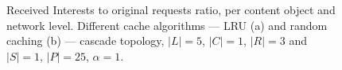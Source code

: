 \begin{figure}[h!]
    \centering


    \cprotect\caption{Received Interests to original requests ratio, per content 
        object and network level. Different cache algorithms --- LRU (a) and 
        random caching (b) --- cascade topology, $|L| = 5$, $|C| = 1$, 
        $|R| = 3$ and $|S| = 1$, $|P| = 25$, $\alpha = 1$.}
    \label{fig:exp-results-latency-cascade}

\end{figure}

